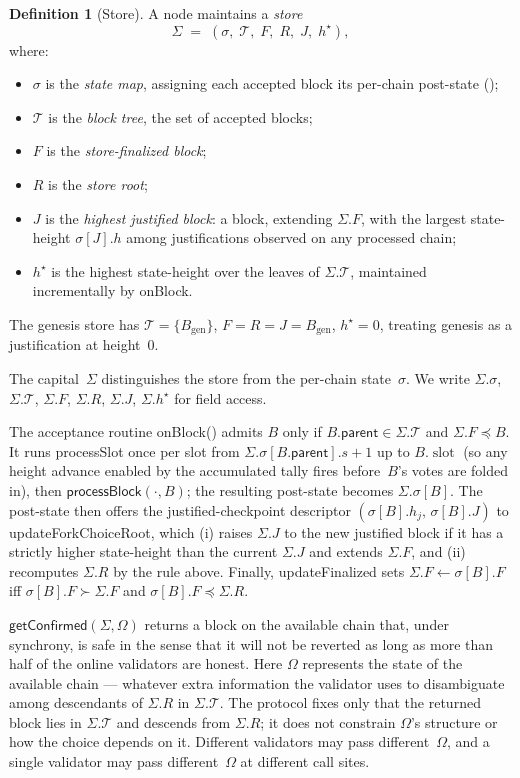 \documentclass{article}
\newcommand{\genesis}{\ensuremath{B_{\mathrm{gen}}}}
\newcommand{\T}[0]{\ensuremath{\mathcal{T}}}
\newcommand{\slot}[0]{\ensuremath{\operatorname{\mathrm{slot}}}}
\newcommand{\parent}{\mathsf{parent}}
\newcommand{\processSlot}{\textsf{processSlot}\xspace}
\newcommand{\processBlock}{\textsf{processBlock}\xspace}
\newcommand{\onBlock}{\textsf{onBlock}\xspace}
\newcommand{\updateForkChoiceRoot}{\textsf{updateForkChoiceRoot}\xspace}
\newcommand{\updateFinalized}{\textsf{updateFinalized}\xspace}
\newcommand{\getConfirmed}{\textsf{getConfirmed}\xspace}
\theoremstyle{plain}
\theoremstyle{definition}
\newtheorem{definition}[theorem]{Definition}
\theoremstyle{remark}
\begin{document}
\begin{definition}[Store]\label{def:store}
A node maintains a \emph{store}
\[
  \Sigma \;=\; (\sigma,\; \T,\; F,\; R,\; J,\; h^\star),
\]
where:
\begin{itemize}
  \item $\sigma$ is the \emph{state map}, assigning each accepted block its per-chain post-state ();
  \item $\T$ is the \emph{block tree}, the set of accepted blocks;
  \item $F$ is the \emph{store-finalized block};
  \item $R$ is the \emph{store root};
  \item $J$ is the \emph{highest justified block}: a block, extending $\Sigma.F$, with the largest state-height $\sigma[J].h$ among justifications observed on any processed chain;
  \item $h^\star$ is the highest state-height over the leaves of $\Sigma.\T$, maintained incrementally by \onBlock.
\end{itemize}
The genesis store has $\T = \{\genesis\}$, $F = R = J = \genesis$, $h^\star = 0$, treating genesis as a justification at height~$0$.
\end{definition}

The capital~$\Sigma$ distinguishes the store from the per-chain state~$\sigma$.
We write $\Sigma.\sigma$, $\Sigma.\T$, $\Sigma.F$, $\Sigma.R$, $\Sigma.J$, $\Sigma.h^\star$ for field access.

The acceptance routine \onBlock () admits $B$ only if $B.\parent \in \Sigma.\T$ and $\Sigma.F \preceq B$.
It runs \processSlot once per slot from $\Sigma.\sigma[B.\parent].s + 1$ up to $B.\slot$ (so any height advance enabled by the accumulated tally fires before~$B$'s votes are folded in), then $\processBlock(\cdot, B)$; the resulting post-state becomes $\Sigma.\sigma[B]$.
The post-state then offers the justified-checkpoint descriptor $(\sigma[B].h_j,\, \sigma[B].J)$ to \updateForkChoiceRoot, which (i) raises $\Sigma.J$ to the new justified block if it has a strictly higher state-height than the current $\Sigma.J$ and extends $\Sigma.F$, and (ii) recomputes $\Sigma.R$ by the rule above.
Finally, \updateFinalized sets $\Sigma.F \gets \sigma[B].F$ iff $\sigma[B].F \succ \Sigma.F$ and $\sigma[B].F \preceq \Sigma.R$.

$\getConfirmed(\Sigma, \Omega)$ returns a block on the available chain that, under synchrony, is safe in the sense that it will not be reverted as long as more than half of the online validators are honest. Here $\Omega$ represents the state of the available chain --- whatever extra information the validator uses to disambiguate among descendants of $\Sigma.R$ in $\Sigma.\T$. The protocol fixes only that the returned block lies in $\Sigma.\T$ and descends from $\Sigma.R$; it does not constrain $\Omega$'s structure or how the choice depends on it. Different validators may pass different~$\Omega$, and a single validator may pass different~$\Omega$ at different call sites.
\end{document}
